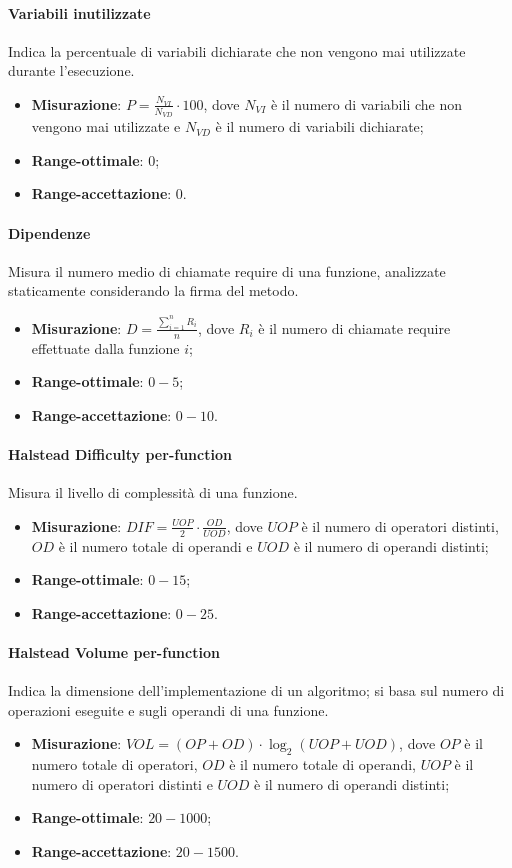 \paragraph{Variabili inutilizzate}
Indica la percentuale di variabili dichiarate che non vengono mai utilizzate durante l'esecuzione.
\begin{itemize}
\item \textbf{Misurazione}: $P = \frac{N_{VI}}{N_{VD}} \cdot 100$, dove $N_{VI}$ è il numero di variabili che non vengono mai utilizzate e $N_{VD}$ è il numero di variabili dichiarate;
\item \textbf{Range-ottimale}: $0$;
\item \textbf{Range-accettazione}: $0$.
\end{itemize}
\paragraph{Dipendenze}
Misura il numero medio di chiamate require di una funzione, analizzate staticamente considerando la firma del metodo.
\begin{itemize}
\item \textbf{Misurazione}: $D = \frac{\sum_{i=1}^{n} R_{i}}{n}$, dove $R_{i}$ è il numero di chiamate require effettuate dalla funzione $i$;
\item \textbf{Range-ottimale}: $0 - 5$;
\item \textbf{Range-accettazione}: $0 - 10$.
\end{itemize}
\paragraph{Halstead Difficulty per-function}
Misura il livello di complessità di una funzione.
\begin{itemize}
\item \textbf{Misurazione}: $DIF = \frac{UOP}{2} \cdot \frac{OD}{UOD}$, dove $UOP$ è il numero di operatori distinti, $OD$ è il numero totale di operandi e $UOD$ è il numero di operandi distinti;
\item \textbf{Range-ottimale}: $0 - 15$;
\item \textbf{Range-accettazione}: $0 - 25$.
\end{itemize}
\paragraph{Halstead Volume per-function}
Indica la dimensione dell'implementazione di un algoritmo; si basa sul numero di operazioni eseguite e sugli operandi di una funzione.
\begin{itemize}
\item \textbf{Misurazione}: $VOL = (OP + OD) \cdot \log_{2}(UOP + UOD)$, dove $OP$ è il numero totale di operatori, $OD$ è il numero totale di operandi, $UOP$ è il numero di operatori distinti e $UOD$ è il numero di operandi distinti;
\item \textbf{Range-ottimale}: $20 - 1000$;
\item \textbf{Range-accettazione}: $20 - 1500$.
\end{itemize}
